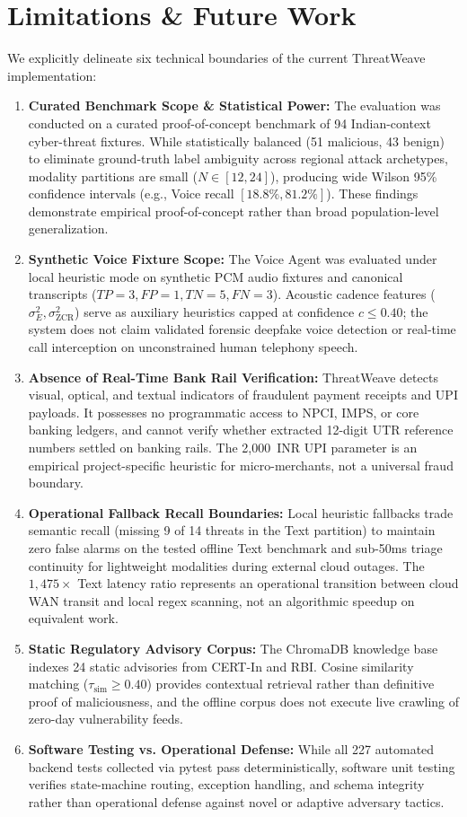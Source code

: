 \documentclass[conference]{IEEEtran}
\begin{document}
\section{Limitations \& Future Work}
We explicitly delineate six technical boundaries of the current ThreatWeave implementation:
\begin{enumerate}
    \item \textbf{Curated Benchmark Scope \& Statistical Power:} The evaluation was conducted on a curated proof-of-concept benchmark of 94 Indian-context cyber-threat fixtures. While statistically balanced (51 malicious, 43 benign) to eliminate ground-truth label ambiguity across regional attack archetypes, modality partitions are small ($N \in [12, 24]$), producing wide Wilson 95\% confidence intervals (e.g., Voice recall $[18.8\%, 81.2\%]$). These findings demonstrate empirical proof-of-concept rather than broad population-level generalization.
    \item \textbf{Synthetic Voice Fixture Scope:} The Voice Agent was evaluated under local heuristic mode on synthetic PCM audio fixtures and canonical transcripts ($TP=3, FP=1, TN=5, FN=3$). Acoustic cadence features ($\sigma_E^2, \sigma_{\text{ZCR}}^2$) serve as auxiliary heuristics capped at confidence $c \le 0.40$; the system does not claim validated forensic deepfake voice detection or real-time call interception on unconstrained human telephony speech.
    \item \textbf{Absence of Real-Time Bank Rail Verification:} ThreatWeave detects visual, optical, and textual indicators of fraudulent payment receipts and UPI payloads. It possesses no programmatic access to NPCI, IMPS, or core banking ledgers, and cannot verify whether extracted 12-digit UTR reference numbers settled on banking rails. The 2,000~INR UPI parameter is an empirical project-specific heuristic for micro-merchants, not a universal fraud boundary.
    \item \textbf{Operational Fallback Recall Boundaries:} Local heuristic fallbacks trade semantic recall (missing 9 of 14 threats in the Text partition) to maintain zero false alarms on the tested offline Text benchmark and sub-50ms triage continuity for lightweight modalities during external cloud outages. The $1,475\times$ Text latency ratio represents an operational transition between cloud WAN transit and local regex scanning, not an algorithmic speedup on equivalent work.
    \item \textbf{Static Regulatory Advisory Corpus:} The ChromaDB knowledge base indexes 24 static advisories from CERT-In and RBI. Cosine similarity matching ($\tau_{\text{sim}} \ge 0.40$) provides contextual retrieval rather than definitive proof of maliciousness, and the offline corpus does not execute live crawling of zero-day vulnerability feeds.
    \item \textbf{Software Testing vs. Operational Defense:} While all 227 automated backend tests collected via pytest pass deterministically, software unit testing verifies state-machine routing, exception handling, and schema integrity rather than operational defense against novel or adaptive adversary tactics.
\end{enumerate}
\end{document}

